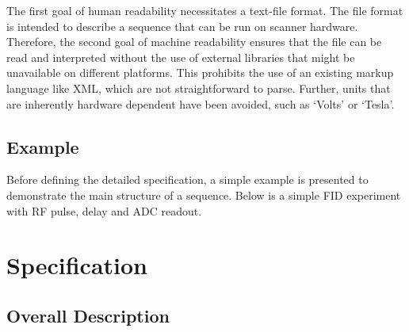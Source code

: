 \documentclass{article}
\begin{document}
The first goal of human readability necessitates a text-file format. The file format is intended to describe a sequence that can be run on scanner hardware. Therefore, the second goal of machine readability ensures that the file can be read and interpreted without the use of external libraries that might be unavailable on different platforms. This prohibits the use of an existing markup language like XML, which are not straightforward to parse. Further, units  that are inherently hardware dependent have been avoided, such as `Volts' or `Tesla'.


\subsection{Example}

Before defining the detailed specification, a simple example is presented to demonstrate the main structure of a sequence. Below is a simple FID experiment with RF pulse, delay and ADC readout.




\section{Specification}\label{sec:specification}

\subsection{Overall Description}
\end{document}
